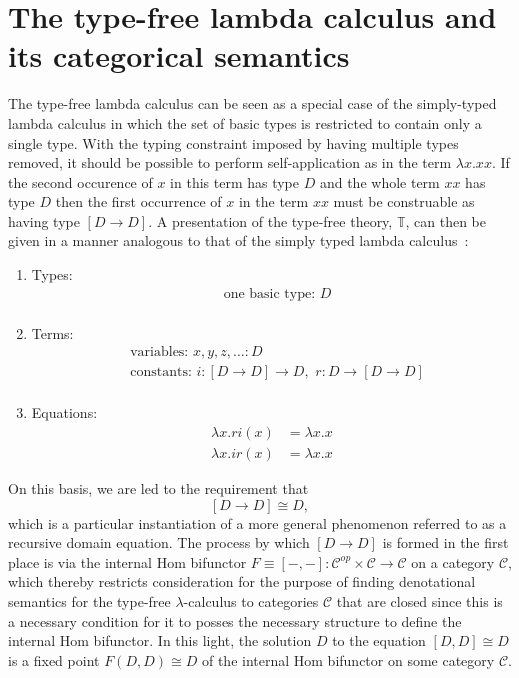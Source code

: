 \section{The type-free lambda calculus and its categorical semantics}
The type-free lambda calculus can be seen as a special case of the simply-typed lambda calculus in which the set of basic types is restricted to contain only a single type. With the typing constraint imposed by having multiple types removed, it should be possible to perform self-application as in the term $\lambda x. xx$. If the second occurence of $x$ in this term has type $D$ and the whole term $xx$ has type $D$ then the first occurrence of $x$ in the term $xx$ must be construable as having type $[D \rightarrow D]$. A presentation of the type-free theory, $\mathbb{T}$, can then be given in a manner analogous to that of the simply typed lambda calculus~\cite{Awodey2000}:
\begin{enumerate}
\item{Types:}
\begin{align*}
&\mbox{one basic type: } D\\
\end{align*}
\item{Terms:}
\begin{align*}
&\mbox{variables: } x,y,z, \ldots \colon D\\
&\mbox{constants: } i \colon [D \rightarrow D] \rightarrow D,\,\, r \colon D \rightarrow [D \rightarrow D]\\
\end{align*}
\item{Equations:}
\begin{align*}
            \lambda x. ri(x) &= \lambda x.x\\
            \lambda x. ir(x) &= \lambda x.x
\end{align*}
\end{enumerate}
On this basis, we are led to the requirement that
$$
[D \rightarrow D] \cong D,
$$
which is a particular instantiation of a more general phenomenon referred to as a recursive domain equation. The process by which $[D \rightarrow D]$ is formed in the first place is via the internal Hom bifunctor $F \equiv [-,-] \colon \mathcal{C}^{op} \times \mathcal{C} \rightarrow \mathcal{C}$ on a category $\mathcal{C}$, which thereby restricts consideration for the purpose of finding denotational semantics for the type-free $\lambda$-calculus to categories $\mathcal{C}$ that are closed since this is a necessary condition for it to posses the necessary structure to define the internal Hom bifunctor. In this light, the solution $D$ to the equation $[D,D] \cong D$ is a fixed point $F(D,D) \cong D$ of the internal Hom bifunctor on some category $\mathcal{C}$.

